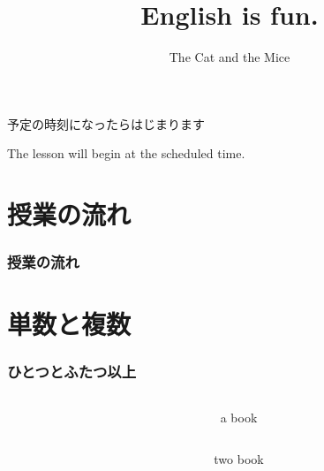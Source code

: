 \documentclass[aspectratio=169,xcolor={dvipsnames,table}]{beamer}
\title{English is fun.}
\subtitle{The Cat and the Mice}
\author{}
\institute[]{}
\date[]
\begin{document}
\begin{frame}[label=waiting]{}
\thispagestyle{empty}
\Large
\raggedright

予定の時刻になったらはじまります

\vfill

\raggedleft

The lesson will begin at the scheduled time.
\end{frame}
\begin{frame}[plain]
  \titlepage
\end{frame}

\section*{授業の流れ}
\begin{frame}[plain]
  \frametitle{授業の流れ}
  \tableofcontents
\end{frame}
\section{単数と複数}
\begin{frame}[plain]\frametitle{ひとつとふたつ以上}
\begin{columns}
\begin{column}{.25\textwidth}
\end{column}\pause
\begin{column}{.5\textwidth}\LARGE
a book
\end{column}
\end{columns}

\pause
\begin{columns}
\begin{column}{.25\textwidth}
\end{column}\pause
\begin{column}{.5\textwidth}\LARGE
two book
\end{column}

\end{columns}
\end{frame}
\end{document}

